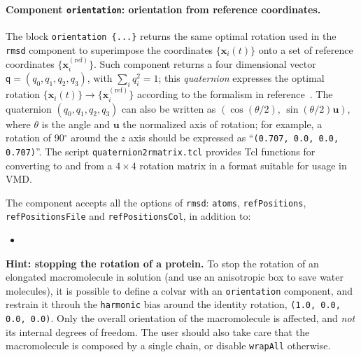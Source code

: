 \paragraph*{Component \texttt{orientation}: orientation from reference
  coordinates.}  The block \texttt{orientation~\{...\}} returns the
same optimal rotation used in the \texttt{rmsd} component to
superimpose the coordinates $\{\mathbf{x}_{i}(t)\}$ onto a set of
reference coordinates $\{\mathbf{x}_{i}^{\mathrm{(ref)}}\}$.  Such
component returns a four dimensional vector $\mathsf{q} = (q_0, q_1,
q_2, q_3)$, with $\sum_{i} q_{i}^{2} = 1$; this \emph{quaternion}
expresses the optimal rotation $\{\mathbf{x}_{i}(t)\} \rightarrow
\{\mathbf{x}_{i}^{\mathrm{(ref)}}\}$ according to the formalism in
reference~\cite{Coutsias2004}.  The quaternion $(q_0, q_1, q_2, q_3)$
can also be written as $\left(\cos(\theta/2), \,
  \sin(\theta/2)\mathbf{u}\right)$, where $\theta$ is the angle and
$\mathbf{u}$ the normalized axis of rotation; for example, a rotation
of 90$^{\circ}$ around the $z$ axis should be expressed as
``\texttt{(0.707, 0.0, 0.0, 0.707)}''.  The script
\texttt{quaternion2rmatrix.tcl} provides Tcl functions for converting
to and from a $4\times{}4$ rotation matrix in a format suitable for
usage in VMD.

The component accepts all the options of \texttt{rmsd}:
\texttt{atoms}, \texttt{refPositions}, \texttt{refPositionsFile} and
\texttt{refPositionsCol}, in addition to:

\begin{itemize}

\item %

\end{itemize}

\textbf{Hint: stopping the rotation of a protein.}  To stop the
rotation of an elongated macromolecule in solution (and use an
anisotropic box to save water molecules), it is possible to define a
colvar with an \texttt{orientation} component, and restrain it throuh
the \texttt{harmonic} bias around the identity rotation, \texttt{(1.0,
  0.0, 0.0, 0.0)}.  Only the overall orientation of the macromolecule
is affected, and \emph{not} its internal degrees of freedom.  The user
should also take care that the macromolecule is composed by a single
chain, or disable \texttt{wrapAll} otherwise.


